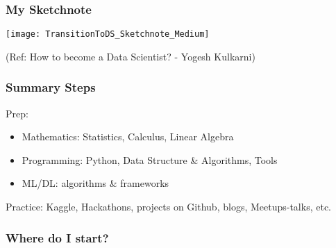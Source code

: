 \begin{frame}[fragile]\frametitle{My Sketchnote}
	
	\begin{center}
	\texttt{[image: TransitionToDS\_Sketchnote\_Medium]}
	\end{center}
{\tiny (Ref: How to become a Data Scientist? - Yogesh Kulkarni)}
\end{frame}

\begin{frame}[fragile]\frametitle{Summary Steps}

Prep:
      \begin{itemize}
			\item Mathematics: Statistics, Calculus, Linear Algebra
			\item Programming: Python, Data Structure \& Algorithms, Tools
			\item ML/DL: algorithms \& frameworks
			\end{itemize}
			
Practice: Kaggle, Hackathons, projects on Github, blogs, Meetups-talks, etc.
			
\end{frame}

\begin{frame}[fragile]\frametitle{Where do I start?}
\hfill
{}


\end{frame}



